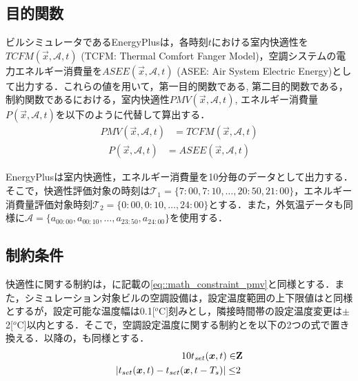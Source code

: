 \subsection{目的関数}
ビルシミュレータであるEnergyPlusは，各時刻$t$における室内快適性を$TCFM(\vec{x},\mathcal{A},t)$ (TCFM: Thermal Comfort Fanger Model)，空調システムの電力エネルギー消費量を$ASEE(\vec{x},\mathcal{A},t)$   (ASEE: Air System Electric Energy)として出力する．これらの値を用いて，第一目的関数である, 第二目的関数である，制約関数であるにおける，室内快適性$PMV(\vec{x},\mathcal{A},t)$, エネルギー消費量$P(\vec{x},\mathcal{A},t)$を以下のように代替して算出する．
\begin{align}
  PMV(\vec{x},\mathcal{A},t) & = TCFM(\vec{x},\mathcal{A},t)
  \label{eq::sim_pmv}
\end{align}
\begin{align}
  P(\vec{x},\mathcal{A},t) & = ASEE(\vec{x},\mathcal{A},t)
  \label{eq::sim_asee}
\end{align}

EnergyPlusは室内快適性，エネルギー消費量を10分毎のデータとして出力する．そこで，快適性評価対象の時刻は$\mathcal{T}_1=\{7:00, 7:10,\dots, 20:50, 21:00\}$，エネルギー消費量評価対象時刻$\mathcal{T}_2=\{0:00, 0:10,\dots, 24:00\}$とする．また，外気温データも同様に$\mathcal{A}=\{a_{00:00},a_{00:10},\dotsc,a_{23:50},a_{24:00}\}$を使用する．


\subsection{制約条件}
快適性に関する制約は，に記載の\eqref{eq::math_constraint_pmv}と同様とする．また，シミュレーション対象ビルの空調設備は，設定温度範囲の上下限値はと同様とするが，設定可能な温度幅は0.1[$^o$C]刻みとし，隣接時間帯の設定温度変更は$\pm $2[$^o$C]以内とする．そこで，空調設定温度に関する制約とを以下の2つの式で置き換える．以降の，も同様とする．
\begin{eqnarray}
  10 t_{set}(\vec{x},t) \in & \bf{Z}
  \label{eq::sim_constraint_tset_int} \\
  |t_{set}(\vec{x},t) - t_{set}(\vec{x},t-T_s)| \leq & 2
  \label{eq::sim_constraint_tset_diff}
\end{eqnarray}

